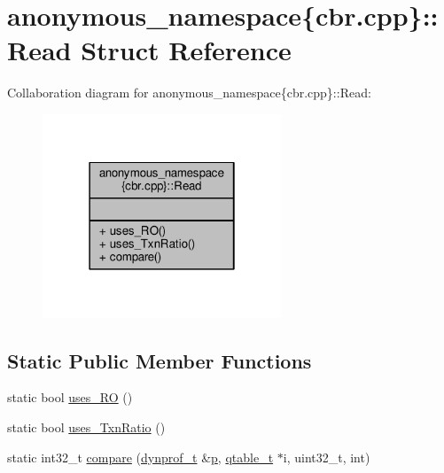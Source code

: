 \hypertarget{structanonymous__namespace_02cbr_8cpp_03_1_1Read}{\section{anonymous\-\_\-namespace\{cbr.\-cpp\}\-:\-:Read Struct Reference}
\label{structanonymous__namespace_02cbr_8cpp_03_1_1Read}
}


Collaboration diagram for anonymous\-\_\-namespace\{cbr.\-cpp\}\-:\-:Read\-:
\nopagebreak
\begin{figure}[H]
\begin{center}
\leavevmode
\includegraphics[width=202pt]{structanonymous__namespace_02cbr_8cpp_03_1_1Read__coll__graph}
\end{center}
\end{figure}
\subsection*{Static Public Member Functions}
\begin{DoxyCompactItemize}
\item 
static bool \hyperlink{structanonymous__namespace_02cbr_8cpp_03_1_1Read_a97b3e117807c25c9c20d17d055164c4a}{uses\-\_\-\-R\-O} ()
\item 
static bool \hyperlink{structanonymous__namespace_02cbr_8cpp_03_1_1Read_aec948f203834ab60f03301e7a6487cc0}{uses\-\_\-\-Txn\-Ratio} ()
\item 
static int32\-\_\-t \hyperlink{structanonymous__namespace_02cbr_8cpp_03_1_1Read_a921c8c50042be8fbd3f4261b75dee5a1}{compare} (\hyperlink{structstm_1_1dynprof__t}{dynprof\-\_\-t} \&\hyperlink{counted__ptr_8hpp_a5c9f59d7c24e3fd6ceae319a968fc3e0}{p}, \hyperlink{structstm_1_1qtable__t}{qtable\-\_\-t} $\ast$i, uint32\-\_\-t, int)
\end{DoxyCompactItemize}



